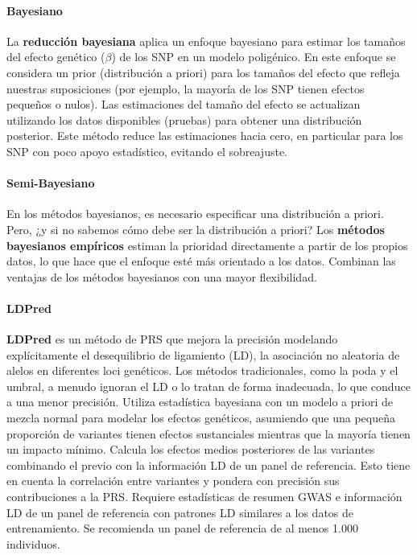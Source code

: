\paragraph{Bayesiano}
La \textbf{reducción bayesiana} aplica un enfoque bayesiano para estimar los tamaños del efecto genético ($\beta$) de los SNP en un modelo poligénico.
En este enfoque se considera un prior (distribución a priori) para los tamaños del efecto que refleja nuestras suposiciones (por ejemplo, la mayoría de los SNP tienen efectos pequeños o nulos).
Las estimaciones del tamaño del efecto se actualizan utilizando los datos disponibles (pruebas) para obtener una distribución posterior.
Este método reduce las estimaciones hacia cero, en particular para los SNP con poco apoyo estadístico, evitando el sobreajuste.

\paragraph{Semi-Bayesiano}
En los métodos bayesianos, es necesario especificar una distribución a priori. Pero, ¿y si no sabemos cómo debe ser la distribución a priori? Los \textbf{métodos bayesianos empíricos} estiman la prioridad directamente a partir de los propios datos, lo que hace que el enfoque esté más orientado a los datos. Combinan las ventajas de los métodos bayesianos con una mayor flexibilidad.

\paragraph{LDPred}
\textbf{LDPred} es un método de PRS que mejora la precisión modelando explícitamente el desequilibrio de ligamiento (LD), la asociación no aleatoria de alelos en diferentes loci genéticos. Los métodos tradicionales, como la poda y el umbral, a menudo ignoran el LD o lo tratan de forma inadecuada, lo que conduce a una menor precisión. Utiliza estadística bayesiana con un modelo a priori de mezcla normal para modelar los efectos genéticos, asumiendo que una pequeña proporción de variantes tienen efectos sustanciales mientras que la mayoría tienen un impacto mínimo. Calcula los efectos medios posteriores de las variantes combinando el previo con la información LD de un panel de referencia. Esto tiene en cuenta la correlación entre variantes y pondera con precisión sus contribuciones a la PRS.
Requiere estadísticas de resumen GWAS e información LD de un panel de referencia con patrones LD similares a los datos de entrenamiento. Se recomienda un panel de referencia de al menos 1.000 individuos. 

